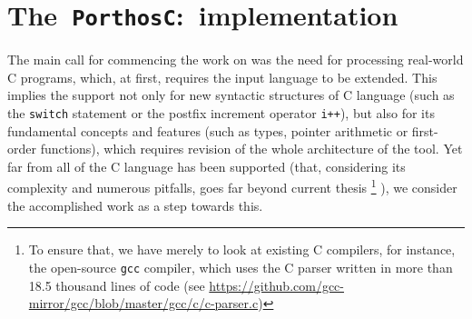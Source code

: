 \chapter{The~\texttt{PorthosC}:~implementation}
\label{ch:impl}

The main call for commencing the work on \porthos[2] was the need for processing real-world C programs, which, at first, requires the input language to be extended.
This implies the support not only for new syntactic structures of C language (such as the \texttt{switch} statement or the postfix increment operator \texttt{i++}), but also for its fundamental concepts and features (such as types, pointer arithmetic or first-order functions), which requires revision of the whole architecture of the tool.
Yet far from all of the C language has been supported (that, considering its complexity and numerous pitfalls, goes far beyond current thesis%
\footnote{To ensure that, we have merely to look at existing C compilers, for instance, the open-source \texttt{gcc} compiler, which uses the C parser written in more than 18.5 thousand lines of code (see \url{https://github.com/gcc-mirror/gcc/blob/master/gcc/c/c-parser.c})}%
), we consider the accomplished work as a step towards this.





